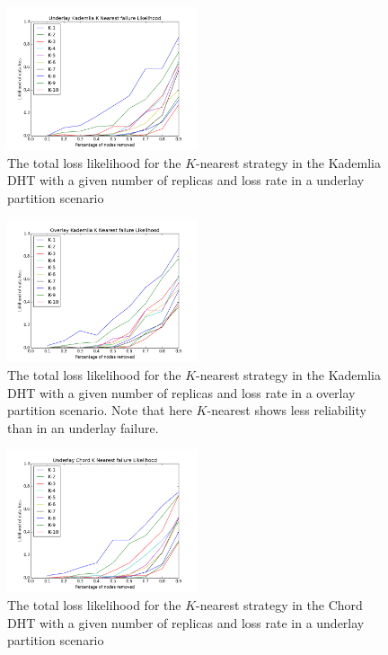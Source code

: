 \begin{figure}[h!]
	\includegraphics[width=0.5\textwidth]{figs/underlay_kad_nearest}
	\caption{The total loss likelihood for the $K$-nearest strategy in the Kademlia DHT with a given number of replicas and loss rate in a underlay partition scenario}
\end{figure}
\begin{figure}[h!]
	\includegraphics[width=0.5\textwidth]{figs/overlay_kad_nearest}
	\caption{The total loss likelihood for the $K$-nearest strategy in the Kademlia DHT with a given number of replicas and loss rate in a overlay partition scenario. Note that here $K$-nearest shows less reliability than in an underlay failure.}
\end{figure}
\begin{figure}[h!]
	\includegraphics[width=0.5\textwidth]{figs/underlay_chord_nearest}
	\caption{The total loss likelihood for the $K$-nearest strategy in the Chord DHT with a given number of replicas and loss rate in a underlay partition scenario}
\end{figure}
